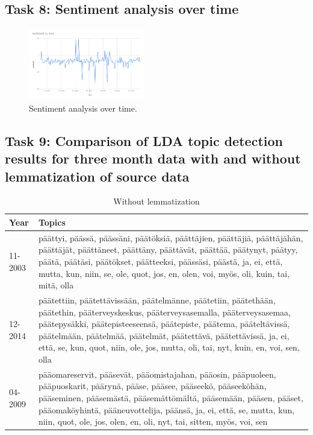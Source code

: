 \documentclass[conference]{IEEEtran}
\begin{document}
\subsection{Task 8: Sentiment analysis over time}

\begin{figure}[htbp]
    \centerline{\includegraphics[width=0.45\textwidth]{figures/fig14.png}}
    \caption{Sentiment analysis over time.}
    \label{sentiment_analysis_over_time}
\end{figure}

\clearpage

\subsection{Task  9: Comparison of LDA topic detection results for three month data with and without lemmatization of source data}

\begin{table}[htbp]
    \caption{Without lemmatization}
    \begin{center}
        \begin{tabularx}{\linewidth}{| l | X |}
            \hline
            Year & Topics \\
            \hline
            11-2003 & päättyi, päässä, päässäni, päätöksiä, päättäjien, päättäjiä, päättäjähän, päättäjät, päättäneet, päättäny, päättävät, päättää, päätynyt, päätyy, päätä, päätäsi, päätökset, päätteeksi, päässäsi, päästä, ja, ei, että, mutta, kun, niin, se, ole, quot, jos, en, olen, voi, myös, oli, kuin, tai, mitä, olla \\
            \hline
            12-2014 & päätettiin, päätettävissään, päätelmänne, päätetiin, päätethään, päätethin, pääterveyskeskus, pääterveysasemalla, pääterveysasemaa, päätepysäkki, päätepisteeseensä, päätepiste, päätema, pääteltävissä, päätelmään, päätelmää, päätelmät, päätettävä, päätettävissä, ja, ei, että, se, kun, quot, niin, ole, jos, mutta, oli, tai, nyt, kuin, en, voi, sen, olla \\
            \hline
            04-2009 & pääomareservit, pääsevät, pääomistajahan, pääosin, pääpuoleen, pääpuoskarit, päärynä, pääse, pääsee, pääseekö, pääseeköhän, pääseminen, pääsemästä, pääsemättömältä, pääsemään, pääsen, pääset, pääomaköyhintä, pääneuvottelija, päänsä, ja, ei, että, se, mutta, kun, niin, quot, ole, jos, olen, en, oli, nyt, tai, sitten, myös, voi, sen\\
            \hline
        \end{tabularx}
        \label{without_lemmatization}
    \end{center}
\end{table}
\end{document}
